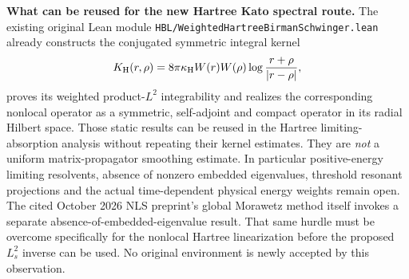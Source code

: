 \documentclass[11pt]{amsart}
\begin{document}
\medskip
\noindent\textbf{What can be reused for the new Hartree Kato
spectral route.}
The existing original Lean module
\texttt{HBL/WeightedHartreeBirmanSchwinger.lean}
already constructs the conjugated symmetric
integral kernel
\[
 K_{\mathrm H}(r,\rho)=8\pi\kappa_{\rm H}
 W(r)W(\rho)\log\frac{r+\rho}{|r-\rho|},
\]
proves its weighted product-\(L^2\) integrability
and realizes the corresponding nonlocal
operator as a symmetric, self-adjoint and compact
operator in its radial Hilbert space.
Those static results can be reused in the
Hartree limiting-absorption analysis without
repeating their kernel estimates. They are
\emph{not} a uniform matrix-propagator smoothing
estimate. In particular positive-energy
limiting resolvents, absence of nonzero
embedded eigenvalues, threshold resonant
projections and the actual time-dependent
physical energy weights remain open.
The cited October 2026 NLS preprint's
global Morawetz method itself invokes a
separate absence-of-embedded-eigenvalue
result. That same hurdle must be overcome
specifically for the nonlocal Hartree
linearization before the proposed \(L_s^2\)
inverse can be used. No original environment
is newly accepted by this observation.
\end{document}

